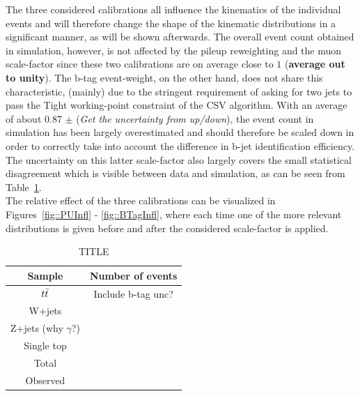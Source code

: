 The three considered calibrations all influence the kinematics of the individual events and will therefore change the shape of the kinematic distributions in a significant manner, as will be shown afterwards.
The overall event count obtained in simulation, however, is not affected by the pileup reweighting and the muon scale-factor since these two calibrations are on average close to $1$ (\textbf{average out to unity}).
The b-tag event-weight, on the other hand, does not share this characteristic, (mainly) due to the stringent requirement of asking for two jets to pass the Tight working-point constraint of the CSV algorithm.
With an average of about 0.87 $\pm$  (\textit{Get the uncertainty from up/down}), the event count in simulation has been largely overestimated and should therefore be scaled down in order to correctly take into account the difference in b-jet identification efficiency.
The uncertainty on this latter scale-factor also largely covers the small statistical disagreement which is visible between data and simulation, as can be seen from Table~\ref{table::DataMCCompBTag}.
\\
The relative effect of the three calibrations can be visualized in Figures~\ref{fig::PUInfl} - \ref{fig::BTagInfl}, where each time one of the more relevant distributions is given before and after the considered scale-factor is applied.

\begin{table}[h!t]
 \caption{TITLE} \label{table::DataMCCompBTag}
 \centering
 \begin{tabular}{c|c}
  \hline
  Sample 			& Number of events 	\\
  \hline
  \hline
  $t\bar{t}$ 			& Include b-tag unc?	\\
  W+jets 			& 			\\
  Z+jets (why $\gamma$?)	& 			\\
  Single top 			& 			\\
  \hline
  Total				& 			\\
  \hline
  \hline
  Observed			&			\\
  \hline
 \end{tabular}
\end{table}

